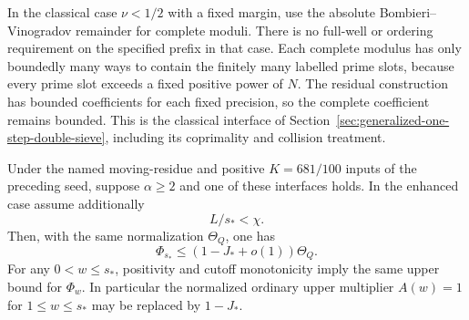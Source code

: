 In the classical case $\nu<1/2$ with a fixed margin, use the absolute
Bombieri--Vinogradov remainder for complete moduli.  There is no
full-well or ordering requirement on the specified prefix in that
case.  Each complete modulus has only boundedly many ways to contain
the finitely many labelled prime slots, because every prime slot
exceeds a fixed positive power of $N$.  The residual construction
has bounded coefficients for each fixed precision, so the complete
coefficient remains bounded.  This is the classical interface of
Section~\ref{sec:generalized-one-step-double-sieve}, including its
coprimality and collision treatment.

\begin{proposition}
\label{prop:second-seed-stable-prefix}
Under the named moving-residue and positive $K=681/100$ inputs of
the preceding seed, suppose $\alpha\ge2$ and one of these interfaces
holds.  In the enhanced case assume additionally
\begin{equation}\label{eq:second-seed-comparison-cutoff}
 L/s_*<\chi.
\end{equation}
Then, with the same normalization $\Theta_Q$, one has
\[
 \Phi_{s_*}\le(1-J_*+o(1))\Theta_Q.
\]
For any $0<w\le s_*$, positivity and cutoff monotonicity imply the
same upper bound for $\Phi_w$.  In particular the normalized ordinary
upper multiplier $A(w)=1$ for $1\le w\le s_*$ may be replaced by
$1-J_*$.
\end{proposition}


